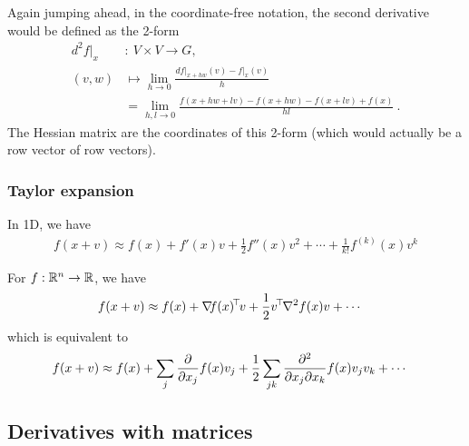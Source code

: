 Again jumping ahead, in the coordinate-free notation, the second derivative would be defined as the 2-form
\begin{align}
d^2f\big|_x &:~ V\times V \to G,~ \\
(v,w) &\mapsto \lim_{h\to 0} \frac{df\big|_{x+hw}(v) -f\big|_{x}(v)}{h} \\
 &= \lim_{h,l\to 0} \frac{f(x+hw+lv) - f(x+hw) - f(x+lv) + f(x)}{hl} ~.
\end{align}
The Hessian matrix are the coordinates of this 2-form (which would actually be a row vector of row vectors).

\subsubsection{Taylor expansion}

In 1D, we have
\begin{align}
f(x+v) \approx f(x) + f'(x) v + \frac{1}{2} f''(x) v^2 + \cdots + \frac{1}{k!} f^{(k)}(x) v^k
\end{align}

For $f: {\mathbb{R}}^n\to {\mathbb{R}}$, we have
\begin{align}
f(x+v)&\approx f(x) + \na f(x)^\T v + \half v^\T \he f(x) v + \cdots
\end{align}
which is equivalent to
\begin{align}
f(x+v)
&\approx f(x)
+ \sum_j \frac{\partial}{\partial x_j} f(x) v_j
+ \frac{1}{2} \sum_{jk} \frac{\partial^2}{\partial x_j \partial x_k} f(x) v_j v_k
+ \cdots
\end{align}


\subsection{Derivatives with matrices}

